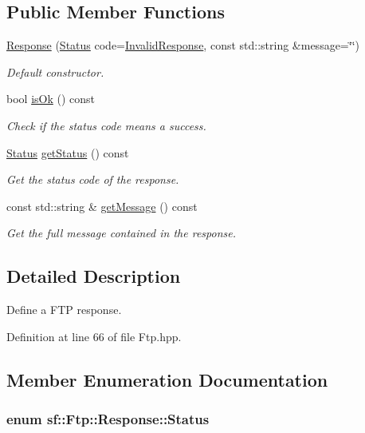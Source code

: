 \subsection*{Public Member Functions}
\begin{DoxyCompactItemize}
\item 
\hyperlink{classsf_1_1Ftp_1_1Response_af300fffd4862774102f978eb22f85d9b}{Response} (\hyperlink{classsf_1_1Ftp_1_1Response_af81738f06b6f571761696291276acb3b}{Status} code=\hyperlink{classsf_1_1Ftp_1_1Response_af81738f06b6f571761696291276acb3ba59e041e4ef186e8ae8d6035973fc46bd}{Invalid\-Response}, const std\-::string \&message=\char`\"{}\char`\"{})
\begin{DoxyCompactList}\small\item\em Default constructor. \end{DoxyCompactList}\item 
bool \hyperlink{classsf_1_1Ftp_1_1Response_a4dadbe0fe0a3ef2d571a017e1645e675}{is\-Ok} () const 
\begin{DoxyCompactList}\small\item\em Check if the status code means a success. \end{DoxyCompactList}\item 
\hyperlink{classsf_1_1Ftp_1_1Response_af81738f06b6f571761696291276acb3b}{Status} \hyperlink{classsf_1_1Ftp_1_1Response_ac7f937b3883d1c4fbc75c003a1786aaa}{get\-Status} () const 
\begin{DoxyCompactList}\small\item\em Get the status code of the response. \end{DoxyCompactList}\item 
const std\-::string \& \hyperlink{classsf_1_1Ftp_1_1Response_a0015675c528a4a84a671484b9e5499d6}{get\-Message} () const 
\begin{DoxyCompactList}\small\item\em Get the full message contained in the response. \end{DoxyCompactList}\end{DoxyCompactItemize}


\subsection{Detailed Description}
Define a F\-T\-P response. 

Definition at line 66 of file Ftp.\-hpp.



\subsection{Member Enumeration Documentation}
\hypertarget{classsf_1_1Ftp_1_1Response_af81738f06b6f571761696291276acb3b}{
\subsubsection[{Status}]{\setlength{\rightskip}{0pt plus 5cm}enum {\bf sf\-::\-Ftp\-::\-Response\-::\-Status}}}\label{classsf_1_1Ftp_1_1Response_af81738f06b6f571761696291276acb3b}


